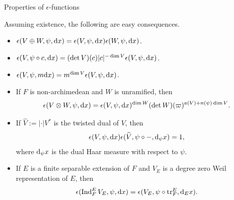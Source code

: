 \begin{frame}{Properties of $ \epsilon $-functions}

Assuming existence, the following are easy consequences.
\begin{itemize}
\item $ \epsilon(V \oplus W, \psi, \mathrm{d} x) = \epsilon(V, \psi, \mathrm{d} x)\epsilon(W, \psi, \mathrm{d} x) $.
\item $ \epsilon(V, \psi \circ c, \mathrm{d} x) = (\det V)(c)|c|^{-\dim V}\epsilon(V, \psi, \mathrm{d} x) $.
\item $ \epsilon(V, \psi, m\mathrm{d} x) = m^{\dim V}\epsilon(V, \psi, \mathrm{d} x) $.
\item If $ F $ is non-archimedean and $ W $ is unramified, then
$$ \epsilon(V \otimes W, \psi, \mathrm{d} x) = \epsilon(V, \psi, \mathrm{d} x)^{\dim W}(\det W)(\varpi)^{a(V) + n(\psi)\dim V}. $$
\item If $ \widehat{V} := |\cdot|V^* $ is the twisted dual of $ V $, then
$$ \epsilon(V, \psi, \mathrm{d} x)\epsilon(\widehat{V}, \psi \circ -, \mathrm{d}_\psi x) = 1, $$
where $ \mathrm{d}_\psi x $ is the dual Haar measure with respect to $ \psi $.
\item If $ E $ is a finite separable extension of $ F $ and $ V_E $ is a degree zero Weil representation of $ E $, then
$$ \epsilon(\operatorname{Ind}_F^E V_E, \psi, \mathrm{d} x) = \epsilon(V_E, \psi \circ \operatorname{tr}_F^E, \mathrm{d}_Ex). $$
\end{itemize}

\end{frame}

